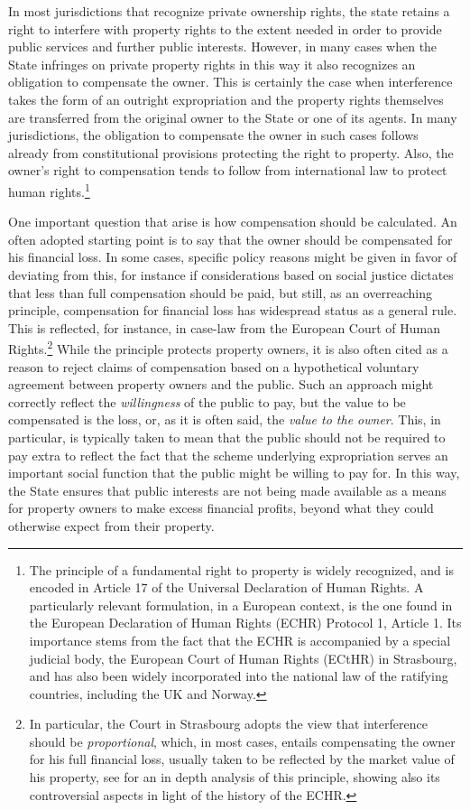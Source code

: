 In most jurisdictions that recognize private ownership rights, the state retains a right to interfere with property rights to the extent needed in order to provide public services and further public interests. However, in many cases when the State infringes on private property rights in this way it also recognizes an obligation to compensate the owner. This is certainly the case when interference takes the form of an outright expropriation and the property rights themselves are transferred from the original owner to the State or one of its agents. In many jurisdictions, the obligation to compensate the owner in such cases follows already from constitutional provisions protecting the right to property. Also, the owner's right to compensation tends to follow from international law to protect human rights.\footnote{The principle of a fundamental right to property is widely recognized, and is encoded in Article 17 of the Universal Declaration of Human Rights. A particularly relevant formulation, in a European context, is the one found in the European Declaration of Human Rights (ECHR) Protocol 1, Article 1. Its importance stems from the fact that the ECHR is accompanied by a special judicial body, the European Court of Human Rights (ECtHR) in Strasbourg, and has also been widely incorporated into the national law of the ratifying countries, including the UK and Norway.} 

One important question that arise is how compensation should be calculated. An often adopted starting point is to say that the owner should be compensated for his financial loss. In some cases, specific policy reasons might be given in favor of deviating from this, for instance if considerations based on social justice dictates that less than full compensation should be paid, but still, as an overreaching principle, compensation for financial loss has widespread status as a general rule. This is reflected, for instance, in case-law from the European Court of Human Rights.\footnote{In particular, the Court in Strasbourg adopts the view that interference should be \emph{proportional}, which, in most cases, entails compensating the owner for his full financial loss, usually taken to be reflected by the market value of his property, see \cite{AllenCom} for an in depth analysis of this principle, showing also its controversial aspects in light of the history of the ECHR.} While the principle protects property owners, it is also often cited as a reason to reject claims of compensation based on a hypothetical voluntary agreement between property owners and the public. Such an approach might correctly reflect the \emph{willingness} of the public to pay, but the value to be compensated is the loss, or, as it is often said, the \emph{value to the owner}. This, in particular, is typically taken to mean that the public should not be required to pay extra to reflect the fact that the scheme underlying expropriation serves an important social function that the public might be willing to pay for. In this way, the State ensures that public interests are not being made available as a means for property owners to make excess financial profits, beyond what they could otherwise expect from their property.

